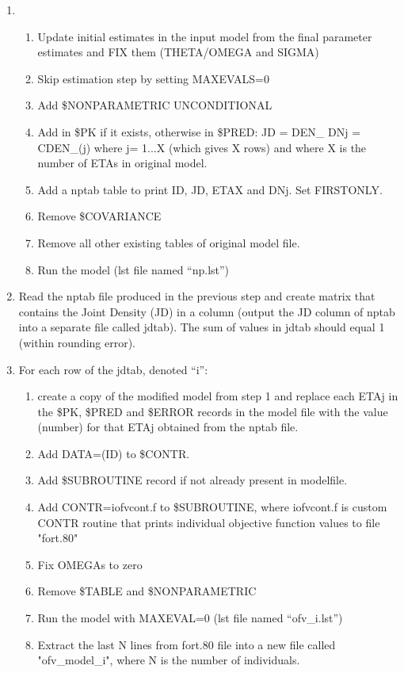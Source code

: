 \begin{enumerate}
\item
	\begin{enumerate}
		\item Update initial estimates in the input model from the final parameter estimates and FIX them (THETA/OMEGA and SIGMA)
		\item Skip estimation step by setting MAXEVALS=0
		\item Add \$NONPARAMETRIC UNCONDITIONAL
		\item Add in \$PK if it exists, otherwise in \$PRED: 
	JD = DEN\_ 
	DNj = CDEN\_(j) 
	where j= 1...X (which gives X rows) and where X is the number of ETAs in original model.
		\item Add a nptab table to print ID, JD, ETAX and DNj. Set FIRSTONLY.
		\item Remove \$COVARIANCE
		\item Remove all other existing tables of original model file.
		\item Run the model	(lst file named “np.lst”)
	\end{enumerate}
\item Read the nptab file produced in the previous step and create matrix that contains the Joint Density (JD) in a column (output the JD column of nptab into a separate file called jdtab). The sum of values in jdtab should equal 1 (within rounding error).
\item For each row of the jdtab, denoted “i”:
	\begin{enumerate}
		\item create a copy of the modified model from step 1 and replace each ETAj in the \$PK, \$PRED and \$ERROR records in the model file with the value (number) for that ETAj obtained from the nptab file.
		\item Add DATA=(ID) to \$CONTR.
		\item Add \$SUBROUTINE record if not already present in modelfile.
		\item Add CONTR=iofvcont.f to \$SUBROUTINE, where iofvcont.f is custom CONTR 	routine that prints individual objective function values to file "fort.80"
		\item Fix OMEGAs to zero
		\item Remove \$TABLE and \$NONPARAMETRIC
		\item Run the model with MAXEVAL=0 (lst file named “ofv\_i.lst”)
		\item Extract the last N lines from fort.80 file into a new file called "ofv\_model\_i", where N is the number of individuals.

\end{enumerate}
\end{enumerate}
